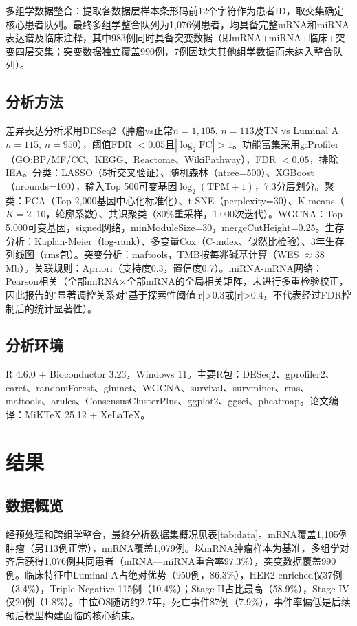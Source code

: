 \documentclass[12pt,a4paper,openany]{ctexbook}
\begin{document}
多组学数据整合：提取各数据层样本条形码前12个字符作为患者ID，取交集确定核心患者队列。最终多组学整合队列为1,076例患者，均具备完整mRNA和miRNA表达谱及临床注释，其中983例同时具备突变数据（即mRNA+miRNA+临床+突变四层交集；突变数据独立覆盖990例，7例因缺失其他组学数据而未纳入整合队列）。

\section{分析方法}
差异表达分析采用DESeq2\cite{love2014moderated}（肿瘤vs正常$n=1,105$, $n=113$及TN vs Luminal A $n=115$, $n=950$），阈值FDR $<0.05$且$|\log_2\text{FC}|>1$。功能富集采用g:Profiler\cite{kolberg2023gprofiler}（GO:BP/MF/CC、KEGG、Reactome、WikiPathway），FDR $<0.05$，排除IEA。分类：LASSO（5折交叉验证）、随机森林（ntree=500）、XGBoost（nrounds=100），输入Top 500可变基因$\log_2(\text{TPM}+1)$，7:3分层划分。聚类：PCA（Top 2,000基因中心化标准化）、t-SNE（perplexity=30）、K-means（$K=2$--10，轮廓系数）、共识聚类\cite{wilkerson2010consensus}（80\%重采样，1,000次迭代）。WGCNA\cite{langfelder2008wgcna}：Top 5,000可变基因，signed网络，minModuleSize=30，mergeCutHeight=0.25。生存分析：Kaplan-Meier（log-rank）、多变量Cox（C-index、似然比检验）、3年生存列线图（rms包）。突变分析：maftools\cite{mayakonda2018maftools}，TMB按每兆碱基计算（WES $\approx$38 Mb）。关联规则：Apriori（支持度0.3，置信度0.7）。miRNA-mRNA网络：Pearson相关（全部miRNA×全部mRNA的全局相关矩阵，未进行多重检验校正，因此报告的"显著调控关系对"基于探索性阈值|r|>0.3或|r|>0.4，不代表经过FDR控制后的统计显著性）。

\section{分析环境}
R 4.6.0 + Bioconductor 3.23，Windows 11。主要R包：DESeq2、gprofiler2、caret、randomForest、glmnet、WGCNA、survival、survminer、rms、maftools、arules、ConsensusClusterPlus、ggplot2、ggsci、pheatmap。论文编译：MiKTeX 25.12 + XeLaTeX。

\chapter{结果}

\section{数据概览}
经预处理和跨组学整合，最终分析数据集概况见表\ref{tab:data}。mRNA覆盖1,105例肿瘤（另113例正常），miRNA覆盖1,079例。以mRNA肿瘤样本为基准，多组学对齐后获得1,076例共同患者（mRNA—miRNA重合率97.3\%），突变数据覆盖990例。临床特征中Luminal A占绝对优势（950例，86.3\%），HER2-enriched仅37例（3.4\%），Triple Negative 115例（10.4\%）；Stage II占比最高（58.9\%），Stage IV仅20例（1.8\%）。中位OS随访约2.7年，死亡事件87例（7.9\%），事件率偏低是后续预后模型构建面临的核心约束。
\end{document}
